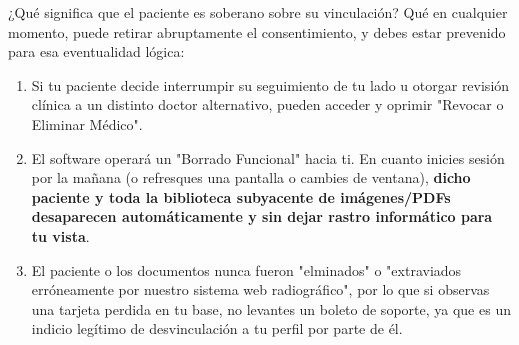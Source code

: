 ¿Qué significa que el paciente es soberano sobre su vinculación? Qué en cualquier momento, puede retirar abruptamente el consentimiento, y debes estar prevenido para esa eventualidad lógica:
\begin{enumerate}
    \item Si tu paciente decide interrumpir su seguimiento de tu lado u otorgar revisión clínica a un distinto doctor alternativo, pueden acceder y oprimir "Revocar o Eliminar Médico".
    \item El software operará un "Borrado Funcional" hacia ti. En cuanto inicies sesión por la mañana (o refresques una pantalla o cambies de ventana), \textbf{dicho paciente y toda la biblioteca subyacente de imágenes/PDFs desaparecen automáticamente y sin dejar rastro informático para tu vista}.
    \item El paciente o los documentos nunca fueron "elminados" o "extraviados erróneamente por nuestro sistema web radiográfico", por lo que si observas una tarjeta perdida en tu base, no levantes un boleto de soporte, ya que es un indicio legítimo de desvinculación a tu perfil por parte de él. 
\end{enumerate}
